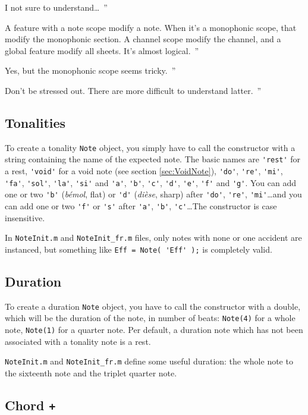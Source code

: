 \documentclass{article}
\newcommand{\note}{\lstinline!Note!\xspace}
\newcommand{\file}[1]{\texttt{#1}\xspace}
\newcommand{\noteInitFile}{\file{NoteInit.m}}
\newcommand{\noteInitFrFile}{\file{NoteInit\_fr.m}}
\newenvironment{meenv}{ \par \noindent \makebox[6em][r]{ \textcolor{mecolor}{Me}: `` --~}}{~''}
\newenvironment{myselfenv}{ \par \noindent \makebox[6em][r]{ \textcolor{myselfcolor}{Myself}: `` --~}}{~''}
\newcommand{\me}[1]{\begin{meenv}#1\end{meenv}}
\newcommand{\myself}[1]{\begin{myselfenv}#1\end{myselfenv}}
\begin{document}
\me{I not sure to understand\dots}
\myself{A feature with a note scope modify a note. When it's a monophonic scope, that modify the monophonic section. A channel scope modify the channel, and a global feature modify all sheets. It's almost logical.}
\me{Yes, but the monophonic scope seems tricky.}
\myself{Don't be stressed out. There are more difficult to understand latter.}

\subsection{Tonalities}
\label{sec:Tonalities}

To create a tonality \note object, you simply have to call the constructor with a string containing the name of the expected note. The basic names are \lstinline!'rest'! for a rest, \lstinline!'void'! for a void note (see section \ref{sec:VoidNote}), \lstinline!'do'!, \lstinline!'re'!, \lstinline!'mi'!, \lstinline!'fa'!, \lstinline!'sol'!, \lstinline!'la'!, \lstinline!'si'! and \lstinline!'a'!, \lstinline!'b'!, \lstinline!'c'!, \lstinline!'d'!, \lstinline!'e'!, \lstinline!'f'! and \lstinline!'g'!. You can add one or two \lstinline!'b'! (\emph{b\'emol}, flat) or \lstinline!'d'! (\emph{di\`ese}, sharp) after \lstinline!'do'!, \lstinline!'re'!, \lstinline!'mi'!\dots and you can add one or two \lstinline!'f'! or \lstinline!'s'! after \lstinline!'a'!, \lstinline!'b'!, \lstinline!'c'!\dots The constructor is case insensitive.

In \noteInitFile and \noteInitFrFile files, only notes with none or one accident are instanced, but something like \lstinline!Eff = Note( 'Eff' );! is completely valid.

\subsection{Duration}
\label{sec:Duration}

To create a duration \note object, you have to call the constructor with a double, which will be the duration of the note, in number of beats: \lstinline!Note(4)! for a whole note, \lstinline!Note(1)! for a quarter note. Per default, a duration note which has not been associated with a tonality note is a rest.

\noteInitFile and \noteInitFrFile define some useful duration: the whole note to the sixteenth note and the triplet quarter note.

\subsection{Chord \lstinline!+!}
\label{sec:Chord}
\end{document}
